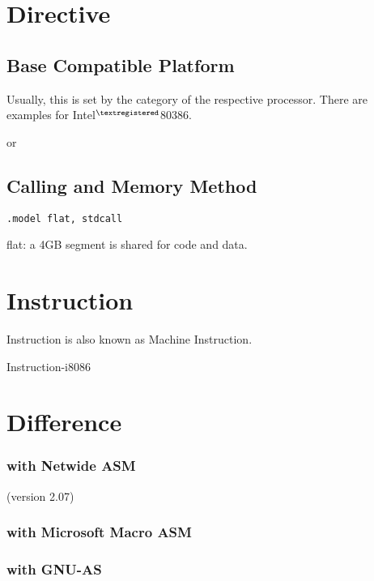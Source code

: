 
\section{Directive}

\subsection{Base Compatible Platform}

Usually, this is set by the category of the respective processor.
There are examples for Intel$^{\textregistered}$80386.


 or \T{[CPU 386]}




\subsection{Calling and Memory Method}


\verb`.model flat, stdcall` 

flat: a 4GB segment is shared for code and data.

\section{Instruction}

Instruction is also known as {Machine Instruction}.

{Instruction-i8086}

\section{Difference}

\subsubsection{with Netwide ASM} (version 2.07)


\subsubsection{with Microsoft Macro ASM}


\subsubsection{with GNU-AS}

